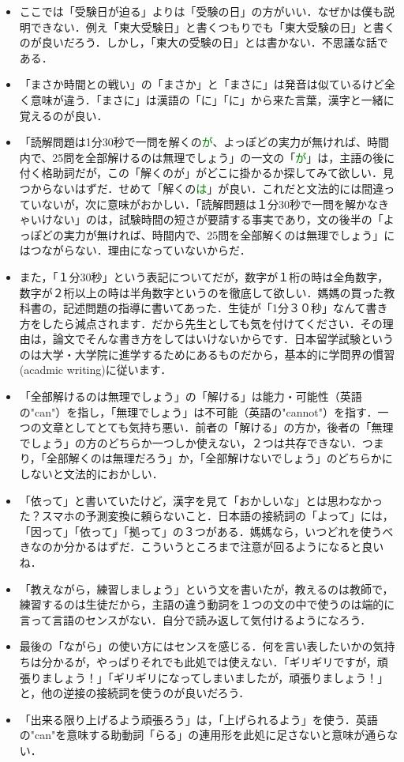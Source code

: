 \documentclass[uplatex, 12pt, dvipdfmx]{jsarticle}
\begin{document}
\begin{itemize}
    \item ここでは「受験日が迫る」よりは「受験の日」の方がいい．なぜかは僕も説明できない．例え「東大受験日」と書くつもりでも「東大受験の日」と書くのが良いだろう．しかし，「東大の受験の日」とは書かない．不思議な話である．
    \item 「まさか時間との戦い」の「まさか」と「まさに」は発音は似ているけど全く意味が違う．「まさに」は漢語の「に」「に」から来た言葉，漢字と一緒に覚えるのが良い．
    \item 「読解問題は1分30秒で一問を解くの\textcolor{green}{が}、よっぽどの実力が無ければ、時間内で、25問を全部解けるのは無理でしょう」の一文の「\textcolor{green}{が}」は，主語の後に付く格助詞だが，この「解くのが」がどこに掛かるか探してみて欲しい．見つからないはずだ．せめて「解くの\textcolor{green}{は}」が良い．これだと文法的には間違っていないが，次に意味がおかしい．「読解問題は１分30秒で一問を解かなきゃいけない」のは，試験時間の短さが要請する事実であり，文の後半の「よっぽどの実力が無ければ、時間内で、25問を全部解くのは無理でしょう」にはつながらない．理由になっていないからだ．
    \item また，「１分30秒」という表記についてだが，数字が１桁の時は全角数字，数字が２桁以上の時は半角数字というのを徹底して欲しい．媽媽の買った教科書の，記述問題の指導に書いてあった．生徒が「1分３０秒」なんて書き方をしたら減点されます．だから先生としても気を付けてください．その理由は，論文でそんな書き方をしてはいけないからです．日本留学試験というのは大学・大学院に進学するためにあるものだから，基本的に学問界の慣習(acadmic writing)に従います．
    \item 「全部解けるのは無理でしょう」の「解ける」は能力・可能性（英語の"can"）を指し，「無理でしょう」は不可能（英語の"cannot"）を指す．一つの文章としてとても気持ち悪い．前者の「解ける」の方か，後者の「無理でしょう」の方のどちらか一つしか使えない，２つは共存できない．つまり，「全部解くのは無理だろう」か，「全部解けないでしょう」のどちらかにしないと文法的におかしい．
    \item 「依って」と書いていたけど，漢字を見て「おかしいな」とは思わなかった？スマホの予測変換に頼らないこと．日本語の接続詞の「よって」には，「因って」「依って」「拠って」の３つがある．媽媽なら，いつどれを使うべきなのか分かるはずだ．こういうところまで注意が回るようになると良いね．
    \item 「教えながら，練習しましょう」という文を書いたが，教えるのは教師で，練習するのは生徒だから，主語の違う動詞を１つの文の中で使うのは端的に言って言語のセンスがない．自分で読み返して気付けるようになろう．
    \item 最後の「ながら」の使い方にはセンスを感じる．何を言い表したいかの気持ちは分かるが，やっぱりそれでも此処では使えない．「ギリギリですが，頑張りましょう！」「ギリギリになってしまいましたが，頑張りましょう！」と，他の逆接の接続詞を使うのが良いだろう．
    \item 「出来る限り上げるよう頑張ろう」は，「上げられるよう」を使う．英語の"can"を意味する助動詞「らる」の連用形を此処に足さないと意味が通らない．
\end{itemize}
\end{document}
